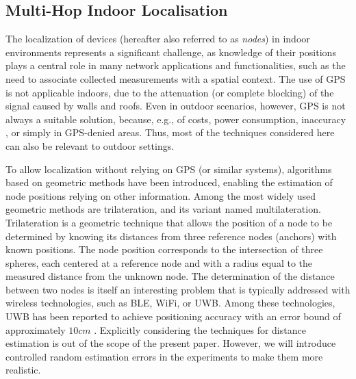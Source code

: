 \documentclass[runningheads]{llncs}
\begin{document}
\subsection{Multi-Hop Indoor Localisation}
The localization of devices (hereafter also referred to as \emph{nodes}) in indoor environments represents a significant challenge, as knowledge of their positions plays a central role in many network applications and functionalities, such as the need to associate collected measurements with a spatial context. The use of GPS is not applicable indoors, due to the attenuation (or complete blocking) of the signal caused by walls and roofs.
Even in outdoor scenarios, however, GPS is not always a suitable solution, because, e.g., of costs, power consumption, inaccuracy \cite{DBLP:journals/telsys/NiculescuN03}, or simply in GPS-denied areas. Thus, most of the techniques considered here can also be relevant to outdoor settings.

To allow localization without relying on GPS (or similar systems), algorithms based on geometric methods have been introduced, enabling the estimation of node positions relying on other information. Among the most widely used geometric methods are trilateration, and its variant named multilateration. Trilateration \cite{DBLP:journals/trob/ThomasR05} is a geometric technique that allows the position of a node to be determined by knowing its distances from three reference nodes (anchors) with known positions. The node position corresponds to the intersection of three spheres, each centered at a reference node and with a radius equal to the measured distance from the unknown node. 
The determination of the distance between two nodes is itself an interesting problem that is typically addressed with wireless technologies, such as BLE, WiFi, or UWB. 
Among these technologies, UWB has been reported to achieve positioning accuracy with an error bound of approximately $10cm$ \cite{network4040027}.
Explicitly considering the techniques for distance estimation is out of the scope of the present paper. However, we will introduce controlled random estimation errors in the experiments to make them more realistic.
\end{document}
